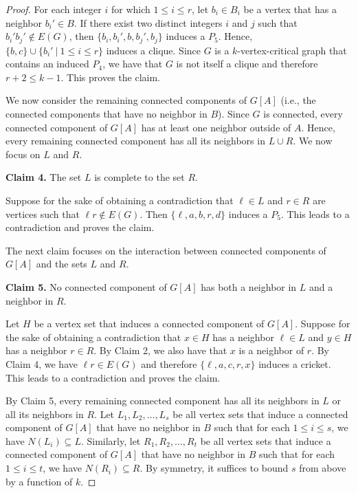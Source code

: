 \documentclass[10pt]{article}
\theoremstyle{definition}
\begin{document}
\begin{proof}
For each integer $i$ for which $1 \leq i \leq r$, let $b_i \in B_i$ be a vertex that has a neighbor $b_i'\in B$. If there exist two distinct integers $i$ and $j$ such that $b_i'b_j' \notin E(G)$, then $\{b_i,b_i',b,b_j',b_j\}$ induces a $P_5$. Hence, $\{b,c\} \cup \{b_i'~|~1 \leq i \leq r\}$ induces a clique. Since $G$ is a $k$-vertex-critical graph that contains an induced $P_4$, we have that $G$ is not itself a clique and therefore $r+2 \leq k-1$. This proves the claim.

\bigskip

\noindent

We now consider the remaining connected components of $G[A]$ (i.e., the connected components that have no neighbor in $B$). Since $G$ is connected, every connected component of $G[A]$ has at least one neighbor outside of $A$. Hence, every remaining connected component has all its neighbors in $L \cup R$. We now focus on $L$ and $R$.

\bigskip

\noindent \textbf{Claim 4.} The set $L$ is complete to the set $R$.

\bigskip

Suppose for the sake of obtaining a contradiction that $\ell \in L$ and $r \in R$ are vertices such that $\ell r \notin E(G)$. Then
$\{\ell,a,b,r,d\}$ induces a $P_5$. This leads to a contradiction and proves the claim.

\bigskip

The next claim focuses on the interaction between connected components of $G[A]$ and the sets $L$ and $R$.

\noindent \textbf{Claim 5.} No connected component of $G[A]$ has both a neighbor in $L$ and a neighbor in $R$.

\bigskip

Let $H$ be a vertex set that induces a connected component of $G[A]$. Suppose for the sake of obtaining a contradiction that $x \in H$ has a neighbor $\ell \in L$ and $y \in H$ has a neighbor $r \in R$. By Claim 2, we also have that $x$ is a neighbor of $r$. By Claim 4, we have $\ell r \in E(G)$ and therefore $\{\ell,a,c,r,x\}$ induces a cricket. This leads to a contradiction and proves the claim.

\bigskip

\noindent

By Claim 5, every remaining connected component has all its neighbors in $L$ or all its neighbors in $R$. Let $L_1, L_2, \ldots, L_s$ be all vertex sets that induce a connected component of $G[A]$ that have no neighbor in $B$ such that for each $1 \leq i \leq s$, we have $N(L_i) \subseteq L$. Similarly, let $R_1, R_2, \ldots, R_t$ be all vertex sets that induce a connected component of $G[A]$ that have no neighbor in $B$ such that for each $1 \leq i \leq t$, we have $N(R_i) \subseteq R$. By symmetry, it suffices to bound $s$ from above by a function of $k$. 


\end{proof}
\end{document}
